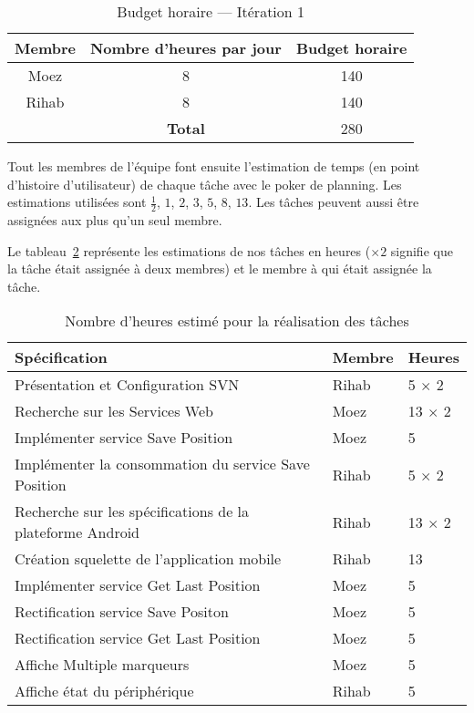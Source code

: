 \begin{table}[H]
    \centering
    \begin{tabular}{| c | c | c |}
        \hline
        \textbf{Membre} & \textbf{Nombre d'heures par jour} & \textbf{Budget horaire} \\ \hline
        \hline

Moez & 8 & 140\\ \hline
Rihab & 8 & 140 \\ \hline
\multicolumn{1}{c|}{} & \textbf{Total} & 280 \\ \cline{2-3}
    \end{tabular}
    \caption{Budget horaire --- Itération 1}
\label{tab:sprint1-capacity}
\end{table}

Tout les membres de l'équipe font ensuite l'estimation de temps (en point
d'histoire d'utilisateur) de chaque tâche avec le poker de planning. Les
estimations utilisées sont $\frac{1}{2}$, $1$, $2$, $3$, $5$, $8$, $13$. Les
tâches peuvent aussi être assignées aux plus qu'un seul membre.

Le tableau~\ref{tab:sprint1-estimation} représente les estimations de nos
tâches en heures ($\times2$ signifie que la tâche était assignée à deux membres)
et le membre à qui était assignée la tâche.

\begin{table}[H]
    \begin{tabular}{| l | l | l |}
        \hline
        \textbf{Spécification} & \textbf{Membre} & \textbf{Heures} \\ \hline
        \hline
Présentation et Configuration SVN & Rihab & 5 $\times$ 2 \\ \hline
Recherche sur les Services Web & Moez & 13 $\times$ 2 \\ \hline
Implémenter service Save Position & Moez & 5 \\ \hline
Implémenter la consommation du service Save Position & Rihab & 5 $\times$ 2 \\ \hline
Recherche sur les spécifications de la plateforme Android & Rihab & 13 $\times$ 2 \\ \hline
Création squelette de l'application mobile & Rihab & 13 \\ \hline
Implémenter service Get Last Position & Moez & 5 \\ \hline
Rectification service Save Positon & Moez & 5 \\ \hline
Rectification service Get Last Position & Moez & 5 \\ \hline
Affiche Multiple marqueurs & Moez & 5 \\ \hline
Affiche état du périphérique & Rihab & 5 \\ \hline
    \end{tabular}
        \caption{Nombre d'heures estimé pour la réalisation des tâches}
\label{tab:sprint1-estimation}
\end{table}

